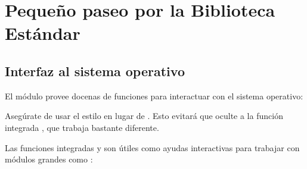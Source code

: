 \documentclass[a5paper,10pt,spanish]{sphinxmanual}
\begin{document}
\chapter{Pequeño paseo por la Biblioteca Estándar}
\label{\detokenize{tutorial/stdlib:brief-tour-of-the-standard-library}}\label{\detokenize{tutorial/stdlib:tut-brieftour}}\label{\detokenize{tutorial/stdlib::doc}}

\section{Interfaz al sistema operativo}
\label{\detokenize{tutorial/stdlib:operating-system-interface}}\label{\detokenize{tutorial/stdlib:tut-os-interface}}
\sphinxAtStartPar
El módulo  provee docenas de funciones para interactuar con el sistema operativo:

\begin{sphinxVerbatim}[commandchars=\\\{\}]
 
      
   
   
\end{sphinxVerbatim}

\sphinxAtStartPar
Asegúrate de usar el estilo  en lugar de . Esto evitará que  oculte a la función integrada , que trabaja bastante diferente.

\ignorespaces 
\sphinxAtStartPar
Las funciones integradas  y  son útiles como ayudas interactivas para trabajar con módulos grandes como :
\end{document}
